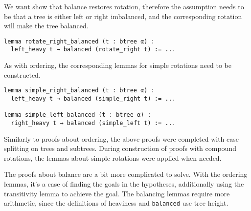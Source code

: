 We want show that balance restores rotation, therefore the assumption needs to be that a tree is either left or right imbalanced, and the corresponding rotation will make the tree balanced.

\begin{lstlisting}
lemma rotate_right_balanced (t : btree α) :
  left_heavy t → balanced (rotate_right t) := ...
\end{lstlisting}

As with ordering, the corresponding lemmas for simple rotations need to be constructed.

\begin{lstlisting}
lemma simple_right_balanced (t : btree α) :
  left_heavy t → balanced (simple_right t) := ...
  
lemma simple_left_balanced (t : btree α) :
  right_heavy t → balanced (simple_left t) := ...
\end{lstlisting}

Similarly to proofs about ordering, the above proofs were completed with case splitting on trees and subtrees. During construction of proofs with compound rotations, the lemmas about simple rotations were applied when needed. 

The proofs about balance are a bit more complicated to solve. With the ordering lemmas, it's a case of finding the goals in the hypotheses, additionally using the transitivity lemma to achieve the goal. The balancing lemmas require more arithmetic, since the definitions of heaviness and \lstinline{balanced} use tree height.